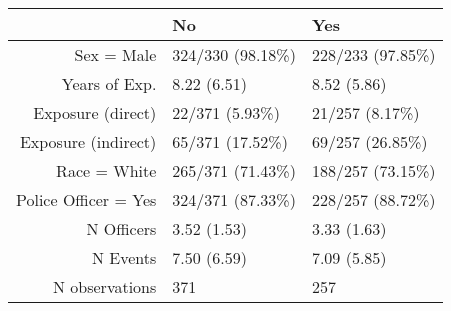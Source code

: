 \begin{table}[ht]
\centering
\begin{tabular}{rll}
  \toprule
 & No & Yes \\ 
  \midrule
Sex = Male & 324/330 (98.18\%) & 228/233 (97.85\%) \\ 
  Years of Exp. & 8.22 (6.51) & 8.52 (5.86) \\ 
  Exposure (direct) & 22/371 (5.93\%) & 21/257 (8.17\%) \\ 
  Exposure (indirect) & 65/371 (17.52\%) & 69/257 (26.85\%) \\ 
  Race = White & 265/371 (71.43\%) & 188/257 (73.15\%) \\ 
  Police Officer = Yes & 324/371 (87.33\%) & 228/257 (88.72\%) \\ 
  N Officers & 3.52 (1.53) & 3.33 (1.63) \\ 
  N Events & 7.50 (6.59) & 7.09 (5.85) \\ 
  N observations & 371 & 257 \\ 
   \bottomrule
\end{tabular}
\end{table}
